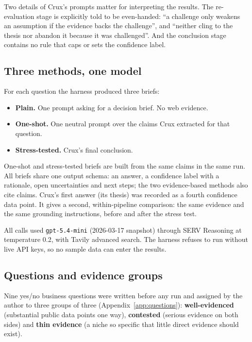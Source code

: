 \documentclass[11pt]{article}
\newcommand{\crux}{Crux}
\begin{document}
Two details of \crux{}'s prompts matter for interpreting the results. The re-evaluation stage is explicitly told to be even-handed: ``a challenge only weakens an assumption if the evidence backs the challenge'', and ``neither cling to the thesis nor abandon it because it was challenged''. And the conclusion stage contains no rule that caps or sets the confidence label.

\subsection{Three methods, one model}

For each question the harness produced three briefs:

\begin{itemize}
\item \textbf{Plain.} One prompt asking for a decision brief. No web evidence.
\item \textbf{One-shot.} One neutral prompt over the claims \crux{} extracted for that question.
\item \textbf{Stress-tested.} \crux{}'s final conclusion.
\end{itemize}

One-shot and stress-tested briefs are built from the same claims in the same run. All briefs share one output schema: an answer, a confidence label with a rationale, open uncertainties and next steps; the two evidence-based methods also cite claims. \crux{}'s first answer (its thesis) was recorded as a fourth confidence data point. It gives a second, within-pipeline comparison: the same evidence and the same grounding instructions, before and after the stress test.

All calls used \texttt{gpt-5.4-mini} (2026-03-17 snapshot) through SERV Reasoning at temperature 0.2, with Tavily advanced search. The harness refuses to run without live API keys, so no sample data can enter the results.

\subsection{Questions and evidence groups}

Nine yes/no business questions were written before any run and assigned by the author to three groups of three (Appendix~\ref{app:questions}): \textbf{well-evidenced} (substantial public data points one way), \textbf{contested} (serious evidence on both sides) and \textbf{thin evidence} (a niche so specific that little direct evidence should exist).
\end{document}
